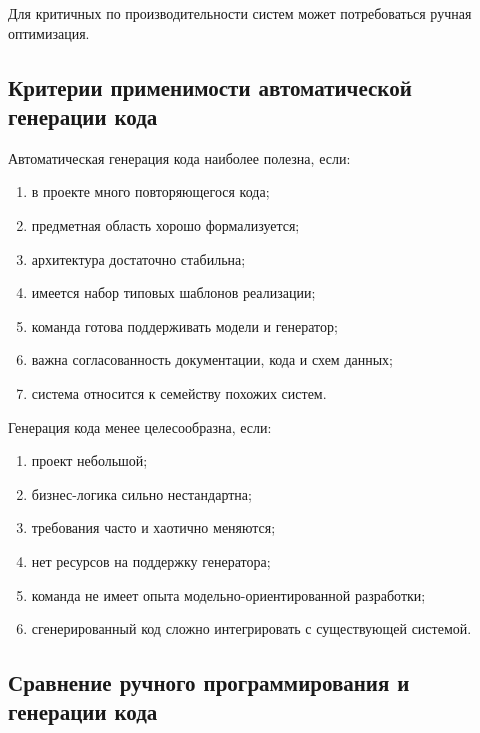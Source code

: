 \documentclass[12pt,a4paper]{article}
\begin{document}
Для критичных по производительности систем может потребоваться ручная оптимизация.

\subsection{Критерии применимости автоматической генерации кода}

Автоматическая генерация кода наиболее полезна, если:

\begin{enumerate}
    \item в проекте много повторяющегося кода;
    \item предметная область хорошо формализуется;
    \item архитектура достаточно стабильна;
    \item имеется набор типовых шаблонов реализации;
    \item команда готова поддерживать модели и генератор;
    \item важна согласованность документации, кода и схем данных;
    \item система относится к семейству похожих систем.
\end{enumerate}

Генерация кода менее целесообразна, если:

\begin{enumerate}
    \item проект небольшой;
    \item бизнес-логика сильно нестандартна;
    \item требования часто и хаотично меняются;
    \item нет ресурсов на поддержку генератора;
    \item команда не имеет опыта модельно-ориентированной разработки;
    \item сгенерированный код сложно интегрировать с существующей системой.
\end{enumerate}

\subsection{Сравнение ручного программирования и генерации кода}
\end{document}
